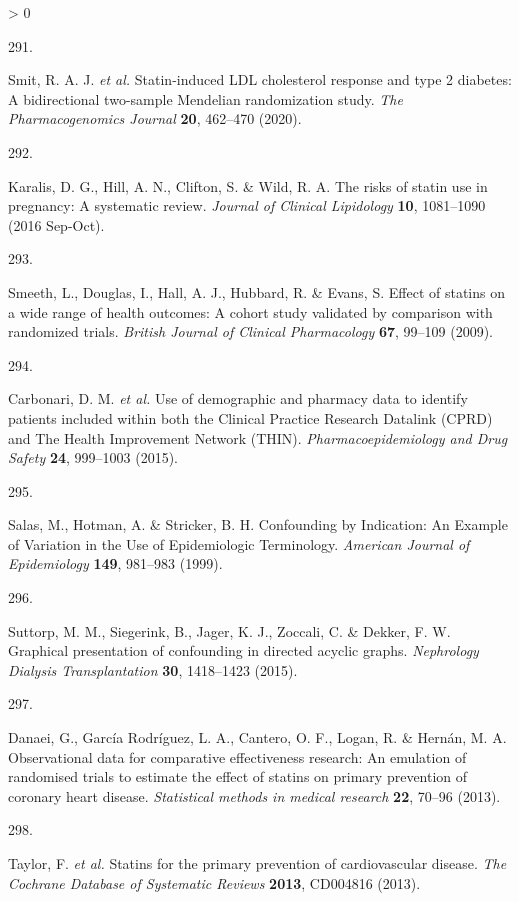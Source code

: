 \documentclass[a4paper, twoside]{templates/ociamthesis}
\newlength{\cslhangindent}
\newlength{\csllabelwidth}
\newenvironment{CSLReferences}[3] %
 {%
  \setlength{\parindent}{0pt}
  \ifodd #1 \everypar{\setlength{\hangindent}{\cslhangindent}}\ignorespaces\fi
  \ifnum #2 > 0
  \setlength{\parskip}{#2\baselineskip}
  \fi
 }%
 {}
\newcommand{\CSLLeftMargin}[1]{\parbox[t]{\maxof{\widthof{#1}}{\csllabelwidth}}{#1}}
\newcommand{\CSLRightInline}[1]{\parbox[t]{\linewidth - \csllabelwidth}{#1}}
\begin{document}
\begin{CSLReferences}{0}{0}
\leavevmode\hypertarget{ref-smit2020}{}%
\CSLLeftMargin{291. }
\CSLRightInline{Smit, R. A. J. \emph{et al.} Statin-induced {LDL} cholesterol response and type 2 diabetes: A bidirectional two-sample {Mendelian} randomization study. \emph{The Pharmacogenomics Journal} \textbf{20}, 462--470 (2020).}

\leavevmode\hypertarget{ref-karalis2016}{}%
\CSLLeftMargin{292. }
\CSLRightInline{Karalis, D. G., Hill, A. N., Clifton, S. \& Wild, R. A. The risks of statin use in pregnancy: A systematic review. \emph{Journal of Clinical Lipidology} \textbf{10}, 1081--1090 (2016 Sep-Oct).}

\leavevmode\hypertarget{ref-smeeth2009}{}%
\CSLLeftMargin{293. }
\CSLRightInline{Smeeth, L., Douglas, I., Hall, A. J., Hubbard, R. \& Evans, S. Effect of statins on a wide range of health outcomes: A cohort study validated by comparison with randomized trials. \emph{British Journal of Clinical Pharmacology} \textbf{67}, 99--109 (2009).}

\leavevmode\hypertarget{ref-carbonari2015}{}%
\CSLLeftMargin{294. }
\CSLRightInline{Carbonari, D. M. \emph{et al.} Use of demographic and pharmacy data to identify patients included within both the {Clinical Practice Research Datalink} ({CPRD}) and {The Health Improvement Network} ({THIN}). \emph{Pharmacoepidemiology and Drug Safety} \textbf{24}, 999--1003 (2015).}

\leavevmode\hypertarget{ref-salas1999}{}%
\CSLLeftMargin{295. }
\CSLRightInline{Salas, M., Hotman, A. \& Stricker, B. H. Confounding by {Indication}: An {Example} of {Variation} in the {Use} of {Epidemiologic Terminology}. \emph{American Journal of Epidemiology} \textbf{149}, 981--983 (1999).}

\leavevmode\hypertarget{ref-suttorp2015}{}%
\CSLLeftMargin{296. }
\CSLRightInline{Suttorp, M. M., Siegerink, B., Jager, K. J., Zoccali, C. \& Dekker, F. W. Graphical presentation of confounding in directed acyclic graphs. \emph{Nephrology Dialysis Transplantation} \textbf{30}, 1418--1423 (2015).}

\leavevmode\hypertarget{ref-danaei2013b}{}%
\CSLLeftMargin{297. }
\CSLRightInline{Danaei, G., García Rodríguez, L. A., Cantero, O. F., Logan, R. \& Hernán, M. A. Observational data for comparative effectiveness research: An emulation of randomised trials to estimate the effect of statins on primary prevention of coronary heart disease. \emph{Statistical methods in medical research} \textbf{22}, 70--96 (2013).}

\leavevmode\hypertarget{ref-taylor2013}{}%
\CSLLeftMargin{298. }
\CSLRightInline{Taylor, F. \emph{et al.} Statins for the primary prevention of cardiovascular disease. \emph{The Cochrane Database of Systematic Reviews} \textbf{2013}, CD004816 (2013).}


\end{CSLReferences}
\end{document}
